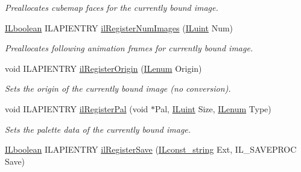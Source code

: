 \begin{DoxyCompactItemize}
\begin{DoxyCompactList}\small\item\em Preallocates cubemap faces for the currently bound image. \end{DoxyCompactList}\item 
\hypertarget{group__register_ga0b3448c79f53f70b5716bab4b82a45cb}{\hyperlink{group__il__types_gaa6aa7c95cfdc06b4d8601ef832b7bb0a}{I\+Lboolean} I\+L\+A\+P\+I\+E\+N\+T\+R\+Y \hyperlink{group__register_ga0b3448c79f53f70b5716bab4b82a45cb}{il\+Register\+Num\+Images} (\hyperlink{group__il__types_gaff8e86a1072c8d7cfe387fb87c6ed8e1}{I\+Luint} Num)}\label{group__register_ga0b3448c79f53f70b5716bab4b82a45cb}

\begin{DoxyCompactList}\small\item\em Preallocates following animation frames for currently bound image. \end{DoxyCompactList}\item 
void I\+L\+A\+P\+I\+E\+N\+T\+R\+Y \hyperlink{group__register_ga79cd7bac1b68d6e78fa585fb57754b97}{il\+Register\+Origin} (\hyperlink{group__il__types_ga62ca73445716183ef42b1f3906a45ed0}{I\+Lenum} Origin)
\begin{DoxyCompactList}\small\item\em Sets the origin of the currently bound image (no conversion). \end{DoxyCompactList}\item 
\hypertarget{group__register_ga66dfc863bb20e62978f3fe613a8de007}{void I\+L\+A\+P\+I\+E\+N\+T\+R\+Y \hyperlink{group__register_ga66dfc863bb20e62978f3fe613a8de007}{il\+Register\+Pal} (void $\ast$Pal, \hyperlink{group__il__types_gaff8e86a1072c8d7cfe387fb87c6ed8e1}{I\+Luint} Size, \hyperlink{group__il__types_ga62ca73445716183ef42b1f3906a45ed0}{I\+Lenum} Type)}\label{group__register_ga66dfc863bb20e62978f3fe613a8de007}

\begin{DoxyCompactList}\small\item\em Sets the palette data of the currently bound image. \end{DoxyCompactList}\item 
\hypertarget{group__register_ga9e630bbaa6a19e4f0a2438bd552ee563}{\hyperlink{group__il__types_gaa6aa7c95cfdc06b4d8601ef832b7bb0a}{I\+Lboolean} I\+L\+A\+P\+I\+E\+N\+T\+R\+Y \hyperlink{group__register_ga9e630bbaa6a19e4f0a2438bd552ee563}{il\+Register\+Save} (\hyperlink{group__il__types_ga1aa1edc3eb344e14acacb02bade24a5a}{I\+Lconst\+\_\+string} Ext, I\+L\+\_\+\+S\+A\+V\+E\+P\+R\+O\+C Save)}\label{group__register_ga9e630bbaa6a19e4f0a2438bd552ee563}


\end{DoxyCompactItemize}
